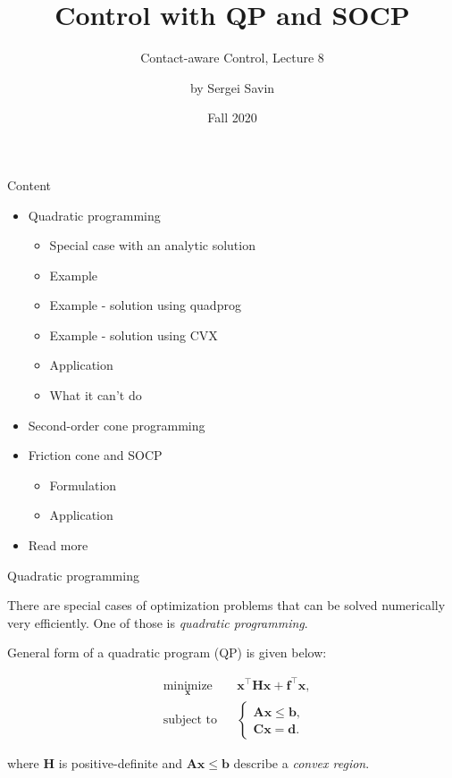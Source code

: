 \documentclass{beamer}
\title{Control with QP and SOCP}
\subtitle{Contact-aware Control, Lecture 8}
\author{by Sergei Savin}
\date{Fall 2020}
\begin{document}
\maketitle


\begin{frame}{Content}

\begin{itemize}
\item Quadratic programming
\begin{itemize}
\item Special case with an analytic solution
\item Example
\item Example - solution using quadprog
\item Example - solution using CVX
\item Application
\item What it can’t do
\end{itemize}
\item Second-order cone programming
\item Friction cone and SOCP
\begin{itemize}
\item Formulation
\item Application
\end{itemize}
\item Read more
\end{itemize}

\end{frame}



\begin{frame}{Quadratic programming}
\begin{flushleft}

There are special cases of optimization problems that can be solved numerically very efficiently. One of those is \emph{quadratic programming}.

\bigskip

General form of a quadratic program (QP) is given below:

%
\begin{equation}
\begin{aligned}
& \underset{\mathbf{x}}{\text{minimize}}
& & \mathbf{x}^\top \mathbf{H} \mathbf{x} + \mathbf{f}^\top\mathbf{x}, \\
& \text{subject to}
& & \begin{cases}
    \mathbf{A}\mathbf{x} \leq \mathbf{b}, \\
    \mathbf{C}\mathbf{x} = \mathbf{d}.
    \end{cases}
\end{aligned}
\end{equation}

where $\mathbf{H}$ is positive-definite and $\mathbf{A}\mathbf{x} \leq \mathbf{b}$ describe a \emph{convex region}.

\end{flushleft}
\end{frame}
\end{document}
